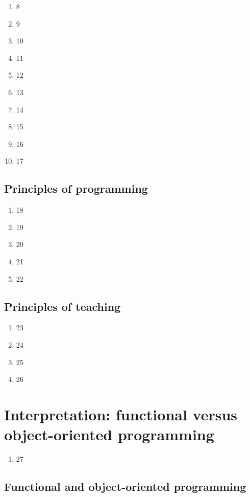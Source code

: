 \documentclass{article}
\begin{document}
\begin{enumerate}
\item 8
\item 9
\item 10
\item 11
\item 12
\item 13
\item 14
\item 15
\item 16
\item 17
\end{enumerate}

\subsection{Principles of programming}

\begin{enumerate}
\item 18
\item 19
\item 20
\item 21
\item 22
\end{enumerate}
  
\subsection{Principles of teaching}

\begin{enumerate}
\item 23
\item 24
\item 25
\item 26
\end{enumerate}

\section{Interpretation: functional versus object-oriented programming}

\begin{enumerate}
\item 27
\end{enumerate}

\subsection{Functional and object-oriented programming}
\end{document}
